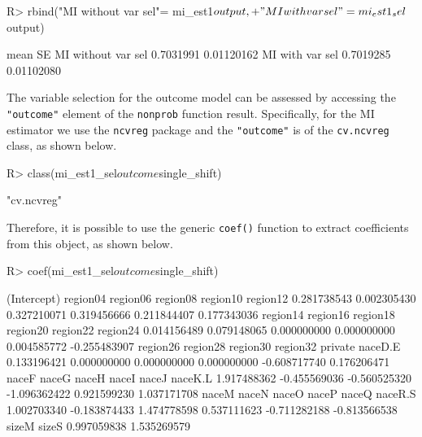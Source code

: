 \documentclass[
]{jss}
\begin{document}
\begin{CodeChunk}
\begin{CodeInput}
R> rbind("MI without var sel"= mi_est1$output,
+       "MI with var sel"   = mi_est1_sel$output)
\end{CodeInput}
\begin{CodeOutput}
                        mean         SE
MI without var sel 0.7031991 0.01120162
MI with var sel    0.7019285 0.01102080
\end{CodeOutput}
\end{CodeChunk}

The variable selection for the outcome model can be assessed by
accessing the \texttt{"outcome"} element of the \texttt{nonprob}
function result. Specifically, for the MI estimator we use the
\texttt{ncvreg} package and the \texttt{"outcome"} is of the
\texttt{cv.ncvreg} class, as shown below.

\begin{CodeChunk}
\begin{CodeInput}
R> class(mi_est1_sel$outcome$single_shift)
\end{CodeInput}
\begin{CodeOutput}
[1] "cv.ncvreg"
\end{CodeOutput}
\end{CodeChunk}

Therefore, it is possible to use the generic \texttt{coef()} function to
extract coefficients from this object, as shown below.

\begin{CodeChunk}
\begin{CodeInput}
R> coef(mi_est1_sel$outcome$single_shift)
\end{CodeInput}
\begin{CodeOutput}
 (Intercept)     region04     region06     region08     region10     region12 
 0.281738543  0.002305430  0.327210071  0.319456666  0.211844407  0.177343036 
    region14     region16     region18     region20     region22     region24 
 0.014156489  0.079148065  0.000000000  0.000000000  0.004585772 -0.255483907 
    region26     region28     region30     region32      private      naceD.E 
 0.133196421  0.000000000  0.000000000  0.000000000 -0.608717740  0.176206471 
       naceF        naceG        naceH        naceI        naceJ      naceK.L 
 1.917488362 -0.455569036 -0.560525320 -1.096362422  0.921599230  1.037171708 
       naceM        naceN        naceO        naceP        naceQ      naceR.S 
 1.002703340 -0.183874433  1.474778598  0.537111623 -0.711282188 -0.813566538 
       sizeM        sizeS 
 0.997059838  1.535269579 
\end{CodeOutput}
\end{CodeChunk}
\end{document}
